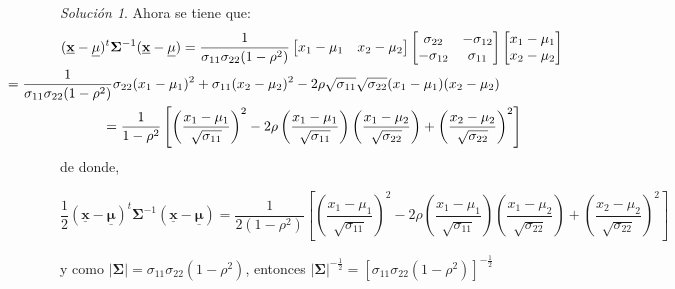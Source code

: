 \documentclass[
]{book}
\theoremstyle{definition}
\theoremstyle{definition}
\theoremstyle{definition}
\theoremstyle{definition}
\theoremstyle{remark}
\newtheorem*{solution}{Solución}
\begin{document}
\begin{solution}
Ahora se tiene que:
\begin{align*}
(\underline{\mathbf{x}}-\underline{\mathbf{\mu}})^t\mathbf{\Sigma}^{-1}(\underline{\mathbf{x}}-\underline{\mathbf{\mu}})&=\frac{1}{\sigma_{11}\sigma_{22}(1-\rho^2)}\begin{bmatrix}
x_1-\mu_1 & x_2-\mu_2 
\end{bmatrix}\begin{bmatrix}
\sigma_{22} & -\sigma_{12} \\ -\sigma_{12} &\sigma_{11}
\end{bmatrix}\begin{bmatrix}
x_1-\mu_1 \\ x_2-\mu_2 
\end{bmatrix}\\
&\hspace{-4.5cm}=\frac{1}{\sigma_{11}\sigma_{22}(1-\rho^2)}\sigma_{22}(x_1-\mu_1)^2+\sigma_{11}(x_2-\mu_2)^2-2\rho \sqrt{\sigma_{11}}\sqrt{\sigma_{22}}(x_1-\mu_1)(x_2-\mu_2)\\
&\hspace{-2.0cm}=\frac{1}{1-\rho^2}\left[\left(\frac{x_1-\mu_1}{\sqrt{\sigma_{11}}} \right)^2-2\rho \left(\frac{x_1-\mu_1}{\sqrt{\sigma_{11}}} \right)\left(\frac{x_1-\mu_2}{\sqrt{\sigma_{22}}} \right) +\left(\frac{x_2-\mu_2}{\sqrt{\sigma_{22}}} \right)^2 \right]\\
\end{align*}
de donde,

\[
\frac{1}{2}(\underline{\mathbf{x}}-\underline{\mathbf{\mu}})^t\mathbf{\Sigma}^{-1}(\underline{\mathbf{x}}-\underline{\mathbf{\mu}})=\frac{1}{2(1-\rho^2)}\left[\left(\frac{x_1-\mu_1}{\sqrt{\sigma_{11}}} \right)^2-2\rho \left(\frac{x_1-\mu_1}{\sqrt{\sigma_{11}}} \right)\left(\frac{x_1-\mu_2}{\sqrt{\sigma_{22}}} \right) +\left(\frac{x_2-\mu_2}{\sqrt{\sigma_{22}}} \right)^2 \right]
\]

y como \(|\mathbf{\Sigma}|=\sigma_{11}\sigma_{22}(1-\rho^2)\), entonces
\(|\mathbf{\Sigma}|^{-\frac{1}{2}}=\left[\sigma_{11}\sigma_{22}(1-\rho^2)\right]^{-\frac{1}{2}}\)


\end{solution}
\end{document}
